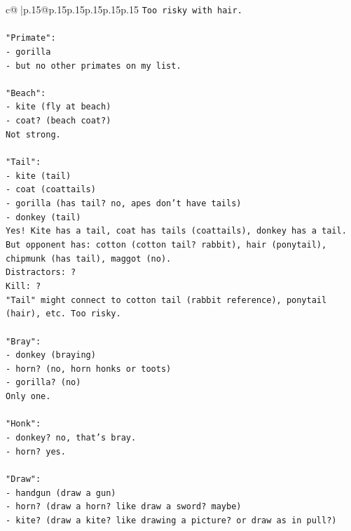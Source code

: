 \documentclass{article}
\begin{document}
{\begin{supertabular}{c@{$\;$}|p{.15\linewidth}@{}p{.15\linewidth}p{.15\linewidth}p{.15\linewidth}p{.15\linewidth}p{.15\linewidth}}
{{{\texttt{Too risky with hair.} \\
\\ 
\texttt{"Primate":} \\
\texttt{{-} gorilla} \\
\texttt{{-} but no other primates on my list.} \\
\\ 
\texttt{"Beach":} \\
\texttt{{-} kite (fly at beach)} \\
\texttt{{-} coat? (beach coat?)} \\
\texttt{Not strong.} \\
\\ 
\texttt{"Tail":} \\
\texttt{{-} kite (tail)} \\
\texttt{{-} coat (coattails)} \\
\texttt{{-} gorilla (has tail? no, apes don't have tails)} \\
\texttt{{-} donkey (tail)} \\
\texttt{Yes! Kite has a tail, coat has tails (coattails), donkey has a tail.} \\
\texttt{But opponent has: cotton (cotton tail? rabbit), hair (ponytail), chipmunk (has tail), maggot (no).} \\
\texttt{Distractors: ?} \\
\texttt{Kill: ?} \\
\texttt{"Tail" might connect to cotton tail (rabbit reference), ponytail (hair), etc. Too risky.} \\
\\ 
\texttt{"Bray":} \\
\texttt{{-} donkey (braying)} \\
\texttt{{-} horn? (no, horn honks or toots)} \\
\texttt{{-} gorilla? (no)} \\
\texttt{Only one.} \\
\\ 
\texttt{"Honk":} \\
\texttt{{-} donkey? no, that's bray.} \\
\texttt{{-} horn? yes.} \\
\\ 
\texttt{"Draw":} \\
\texttt{{-} handgun (draw a gun)} \\
\texttt{{-} horn? (draw a horn? like draw a sword? maybe)} \\
\texttt{{-} kite? (draw a kite? like drawing a picture? or draw as in pull?)} \\
}}}
\end{supertabular}}
\end{document}
